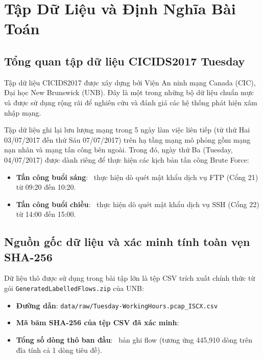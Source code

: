 
\chapter{Tập Dữ Liệu và Định Nghĩa Bài Toán}
\label{chap:du_lieu}

\section{Tổng quan tập dữ liệu CICIDS2017 Tuesday}

Tập dữ liệu CICIDS2017 \cite{sharafaldin2018generating,cicids2017dataset} được xây dựng bởi Viện An ninh mạng Canada (CIC), Đại học New Brunswick (UNB). Đây là một trong những bộ dữ liệu chuẩn mực và được sử dụng rộng rãi để nghiên cứu và đánh giá các hệ thống phát hiện xâm nhập mạng.

Tập dữ liệu ghi lại lưu lượng mạng trong 5 ngày làm việc liên tiếp (từ thứ Hai 03/07/2017 đến thứ Sáu 07/07/2017) trên hạ tầng mạng mô phỏng gồm mạng nạn nhân và mạng tấn công bên ngoài. Trong đó, ngày thứ Ba (Tuesday, 04/07/2017) được dành riêng để thực hiện các kịch bản tấn công Brute Force:
\begin{itemize}
    \item \textbf{Tấn công buổi sáng}: \FTP\ thực hiện dò quét mật khẩu dịch vụ FTP (Cổng 21) từ 09:20 đến 10:20.
    \item \textbf{Tấn công buổi chiều}: \SSH\ thực hiện dò quét mật khẩu dịch vụ SSH (Cổng 22) từ 14:00 đến 15:00.
\end{itemize}

\section{Nguồn gốc dữ liệu và xác minh tính toàn vẹn SHA-256}

Dữ liệu thô được sử dụng trong bài tập lớn là tệp CSV trích xuất chính thức từ gói \texttt{GeneratedLabelledFlows.zip} của UNB:
\begin{itemize}
    \item \textbf{Đường dẫn}: \texttt{data/raw/Tuesday-WorkingHours.pcap\_ISCX.csv}
    \item \textbf{Mã băm SHA-256 của tệp CSV đã xác minh}:
    \begin{center}
        \small\texttt{\DataShaFull}
    \end{center}
    \item \textbf{Tổng số dòng thô ban đầu}: \DataRawRows\ bản ghi flow (tương ứng 445,910 dòng trên đĩa tính cả 1 dòng tiêu đề).
\end{itemize}

